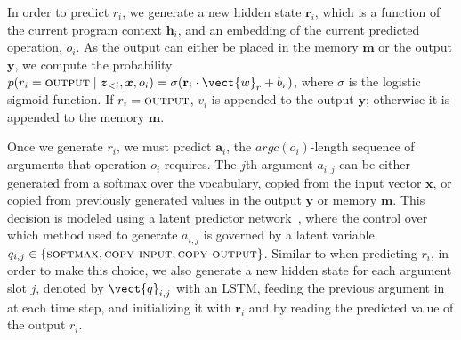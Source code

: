 In order to predict $r_i$, we generate a new hidden state $\mathbf{r}_i$, which is a function of the current program context $\mathbf{h}_i$, and an embedding of the current predicted operation, $o_i$. 
As the output can either be placed in the memory  $\boldsymbol{m}$ or the output $\boldsymbol{y}$, we 
compute the probability $p(r_i = \textsc{output} \mid \boldsymbol{z}_{<i},\boldsymbol{x},o_i)=\sigma (\mathbf{r}_{i} \cdot \vect{w}_r +b_r)$, where $\sigma$ is the logistic 
sigmoid function. 
If $r_i=\textsc{output}$, $v_i$ is appended to the output $\boldsymbol{y}$; otherwise it is appended to the memory $\boldsymbol{m}$.

Once we generate $r_i$, we must predict 
$\boldsymbol{a}_i$, the $\textit{argc}(o_i)$-length sequence of arguments that operation $o_i$ requires.
The $j$th argument $a_{i,j}$ can be either generated from a softmax over the vocabulary, copied from the input vector $\boldsymbol{x}$, or copied from previously generated values in the output $\boldsymbol{y}$ or memory $\boldsymbol{m}$. This decision is modeled using a 
latent predictor network~\cite{DBLP:journals/corr/LingGHKSWB16}, where the control over which method used to generate $a_{i,j}$ is governed by a latent variable $q_{i,j} \in \{\textsc{softmax}, \textsc{copy-input}, \textsc{copy-output}\}$.
Similar to when predicting $r_i$, 
in order to make this choice, 
we also generate a new hidden state for each argument slot $j$,
denoted by $\vect{q}_{i,j}$ with an LSTM, feeding the previous argument in at each time step, and initializing it with $\mathbf{r}_i$ and by reading the predicted value of the output $r_i$.
